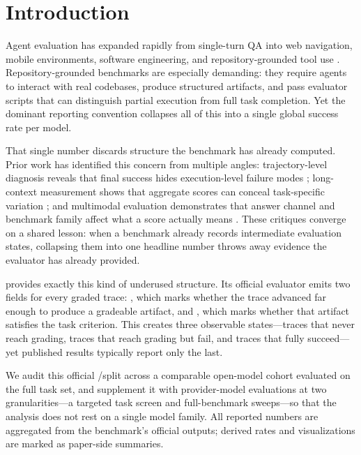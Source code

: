\section{Introduction}

Agent evaluation has expanded rapidly from single-turn QA into web navigation,
mobile environments, software engineering, and repository-grounded tool use
\cite{agentbench,webarena,visualwebarena,androidworld,swebench,swelancer,ambigswe,longsoftwaretasks,gittaskbench,toolgym,deepresearchbench,mcpbench,mcpuniverse}.
Repository-grounded benchmarks are especially demanding: they require agents to
interact with real codebases, produce structured artifacts, and pass evaluator
scripts that can distinguish partial execution from full task completion. Yet
the dominant reporting convention collapses all of this into a single global
success rate per model.

That single number discards structure the benchmark has already computed. Prior
work has identified this concern from multiple angles: trajectory-level
diagnosis reveals that final success hides execution-level failure modes
\cite{agentrx,trajeval}; long-context measurement shows that aggregate scores
can conceal task-specific variation
\cite{lostmiddle,longbench,ruler,infinitebench,nolima,loogle,illusiondiminishingreturns};
and multimodal evaluation demonstrates that answer channel and benchmark family
affect what a score actually means
\cite{mme,mmmu,mathvista,hallusionbench,blink}. These critiques converge on a
shared lesson: when a benchmark already records intermediate evaluation states,
collapsing them into one headline number throws away evidence the evaluator has
already provided.

\gittaskbench \cite{gittaskbench} provides exactly this kind of underused
structure. Its official evaluator emits two fields for every graded trace:
\processmetric, which marks whether the trace advanced far enough to produce a
gradeable artifact, and \resultmetric, which marks whether that artifact
satisfies the task criterion. This creates three observable states---traces that
never reach grading, traces that reach grading but fail, and traces that fully
succeed---yet published results typically report only the last.

We audit this official \processmetric/\resultmetric split across a comparable
open-model cohort evaluated on the full \gittaskbench task set, and supplement
it with provider-model evaluations at two granularities---a targeted task screen
and full-benchmark sweeps---so that the analysis does not rest on a single model
family. All reported numbers are aggregated from the benchmark's official
outputs; derived rates and visualizations are marked as paper-side summaries.

